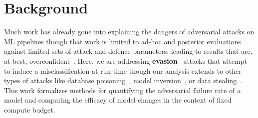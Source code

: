 \section{Background}

Much work has already gone into explaining the dangers of adversarial attacks on ML pipelines \citep{carlini_towards_2017,croce_reliable_2020,pixelattack,fgm,biggio_evasion_2013} though that work is limited to ad-hoc and posterior evaluations against limited sets of attack and defence parameters, leading to results that are, at best, overconfident~\citep{meyers,ma2020imbalanced}. Here, we are addressing \textbf{evasion}~\citep{carlini_towards_2017} attacks that attempt to induce a misclassification at run-time though our analysis extends to other types of attacks like database poisoning~\citep{biggio_poisoning_2013, saha2020hidden}, model inversion~\citep{choquette2021label,li2021membership}, or data stealing~\citep{orekondy2019knockoff}. This work formalizes methods for quantifying the adversarial failure rate of a model and comparing the efficacy of model changes in the context of fixed compute budget.


